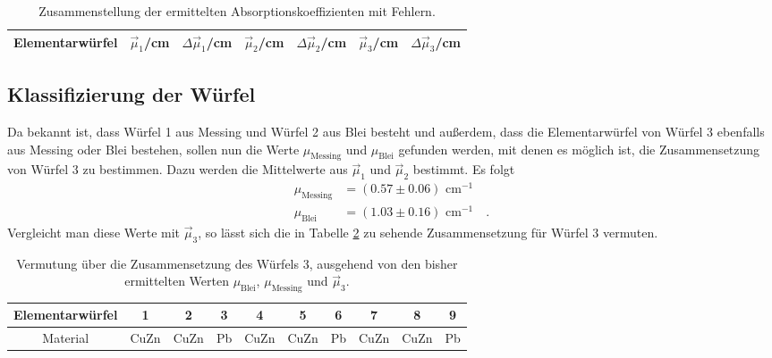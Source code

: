 \begin{table}
\centering
\begin{tabular}{c|cc|cc|cc}
\toprule \midrule
Elementarwürfel & $\vec{\mu}_1$/cm & $\Delta \vec{\mu}_1$/cm& $\vec{\mu}_2$/cm & $\Delta \vec{\mu}_2$/cm& $\vec{\mu}_3$/cm & $\Delta \vec{\mu}_3$/cm \\
\midrule

\midrule
\bottomrule
\end{tabular}
\caption{Zusammenstellung der ermittelten Absorptionskoeffizienten mit Fehlern.}
\label{Ergebnis}
\end{table}
\clearpage
\subsection{Klassifizierung der Würfel}
Da bekannt ist, dass Würfel 1 aus Messing und Würfel 2 aus Blei besteht und außerdem, dass 
die Elementarwürfel von Würfel 3 ebenfalls aus Messing oder Blei bestehen, sollen nun 
die Werte $\mu_\text{Messing}$ und $\mu_\text{Blei}$ gefunden werden, mit denen es möglich ist,
die Zusammensetzung von Würfel 3 zu bestimmen. 
Dazu werden die Mittelwerte aus $\vec{\mu}_1$ und $\vec{\mu}_2$ bestimmt. Es folgt
\begin{align}
\mu_\text{Messing}&=(0.57 \pm 0.06) \text{ cm}^{-1}\\
\mu_\text{Blei}&=(1.03 \pm 0.16) \text{ cm}^{-1} \quad .
\end{align}
Vergleicht man diese Werte mit $\vec{\mu}_3$, so lässt sich die in Tabelle \ref{Zusammensetzung} 
zu sehende Zusammensetzung für Würfel 3 vermuten.
\begin{table}[h]
\centering
\begin{tabular}{cccccccccc}
\toprule \midrule
Elementarwürfel 	& 1&2&3&4&5&6&7&8&9 \\
\midrule
	Material&CuZn &CuZn &Pb	&CuZn &CuZn &Pb &CuZn &CuZn & Pb\\
\midrule
\bottomrule
\end{tabular}
\caption{Vermutung über die Zusammensetzung des Würfels 3, ausgehend von den bisher ermittelten 
Werten $\mu_\text{Blei}$, $\mu_\text{Messing}$ und $\vec{\mu}_3$.}
\label{Zusammensetzung}
\end{table}
\clearpage